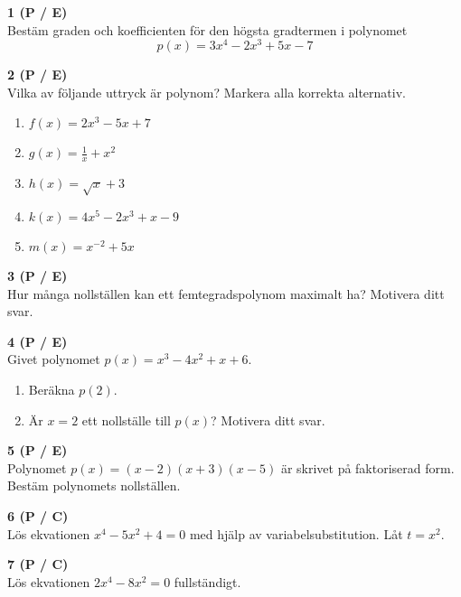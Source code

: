 \documentclass[12pt]{article}
\begin{document}
\noindent
\textbf{1 (P / E)} \\
Bestäm graden och koefficienten för den högsta gradtermen i polynomet
\[
p(x) = 3x^4 - 2x^3 + 5x - 7
\]

\vspace{0.5cm}

\noindent
\textbf{2 (P / E)} \\
Vilka av följande uttryck är polynom? Markera alla korrekta alternativ.
\begin{enumerate}[label=\alph*)]
    \item $f(x) = 2x^3 - 5x + 7$
    \item $g(x) = \frac{1}{x} + x^2$
    \item $h(x) = \sqrt{x} + 3$
    \item $k(x) = 4x^5 - 2x^3 + x - 9$
    \item $m(x) = x^{-2} + 5x$
\end{enumerate}

\vspace{0.5cm}

\noindent
\textbf{3 (P / E)} \\
Hur många nollställen kan ett femtegradspolynom maximalt ha? Motivera ditt svar.

\vspace{0.3cm}

\noindent
\textbf{4 (P / E)} \\
Givet polynomet $p(x) = x^3 - 4x^2 + x + 6$.
\begin{enumerate}[label=\alph*)]
    \item Beräkna $p(2)$.
    \item Är $x = 2$ ett nollställe till $p(x)$? Motivera ditt svar.
\end{enumerate}

\vspace{0.5cm}

\noindent
\textbf{5 (P / E)} \\
Polynomet $p(x) = (x - 2)(x + 3)(x - 5)$ är skrivet på faktoriserad form. Bestäm polynomets nollställen.

\vspace{0.3cm}

\noindent
\textbf{6 (P / C)} \\
Lös ekvationen $x^4 - 5x^2 + 4 = 0$ med hjälp av variabelsubstitution. Låt $t = x^2$.

\vspace{0.5cm}

\noindent
\textbf{7 (P / C)} \\
Lös ekvationen $2x^4 - 8x^2 = 0$ fullständigt.
\end{document}

